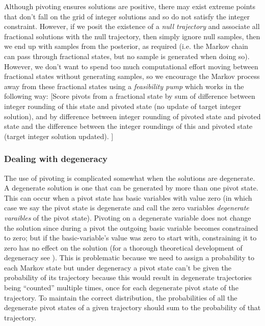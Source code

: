 Although pivoting ensures solutions are positive, there may exist extreme points that don't fall on the grid of integer solutions and so do not satisfy the integer constraint. However, if we posit the existence of a \textit{null trajectory} and associate all fractional solutions with the null trajectory, then simply ignore null samples, then we end up with samples from the posterior, as required (i.e. the Markov chain can pass through fractional states, but no sample is generated when doing so). However, we don't want to spend too much computational effort moving between fractional states without generating samples, so we encourage the Markov process away from these fractional states using a \textit{feasibility pump} which works in the following way: [Score pivots from a fractional state by sum of difference between integer rounding of this state and pivoted state (no update of target integer solution), and by difference between integer rounding of pivoted state and pivoted state and the difference between the integer roundings of this and pivoted state (target integer solution updated). ]


\subsubsection{Dealing with degeneracy}

The use of pivoting is complicated somewhat when the solutions are degenerate. A degenerate solution is one that can be generated by more than one pivot state. This can occur when a pivot state has basic variables with value zero (in which case we say the pivot state is degenerate and call the zero variables \textit{degenerate varaibles} of the pivot state). Pivoting on a degenerate variable does not change the solution since during a pivot the outgoing basic variable becomes constrained to zero; but if the basic-variable's value was zero to start with, constraining it to zero has no effect on the solution (for a thorough theoretical development of degeneracy see \cite{zornig93degeneracy}). This is problematic because we need to assign a probability to each Markov state but under degeneracy a pivot state can't be given the probability of its trajectory because this would result in degenerate trajectories being ``counted'' multiple times, once for each degenerate pivot state of the trajectory. To maintain the correct distribution, the probabilities of all the degenerate pivot states of a given trajectory should sum to the probability of that trajectory.

